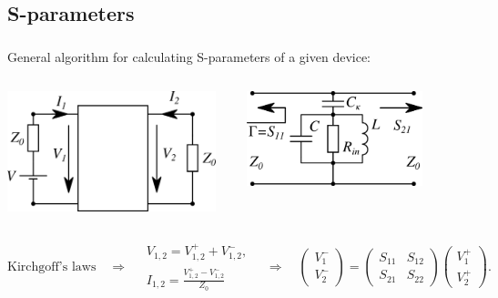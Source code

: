 \documentclass[aspectratio=169, 13pt, t]{beamer}
\newcommand{\rbrkt}[1]{\left( #1 \right)}
\begin{document}
\subsection{S-parameters}
\begin{frame}[t]\frametitle{\secname}\framesubtitle{\subsecname}

General algorithm for calculating S-parameters of a given device:

\vspace{0.5cm}
\begin{columns}[c]
\centering

\includegraphics[width=0.95\textwidth]{tl_scheme_general}
\centering

\vspace{0.35cm}
\includegraphics[width=0.8\textwidth]{tl_scheme}
\end{columns}

\begin{equation*}
\text{Kirchgoff's laws}\quad \Rightarrow \quad
\begin{gathered}
V_{1,2} = V_{1,2}^+ + V_{1,2}^- ,\\
I_{1,2} = \frac{ V_{1,2}^+ - V_{1,2}^- }{Z_0}
\end{gathered} \quad \Rightarrow \quad
\rbrkt{\begin{matrix}
V_1^- \\
V_2^-
\end{matrix}} = 
\rbrkt{\begin{matrix}
S_{11} & S_{12} \\
S_{21} & S_{22}
\end{matrix}}
\rbrkt{\begin{matrix}
V_1^+ \\
V_2^+
\end{matrix}}.
\end{equation*}

\end{frame}
\end{document}
